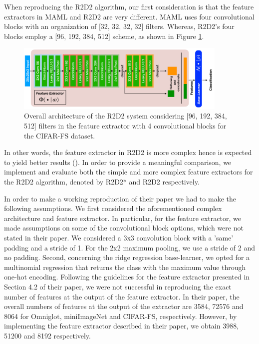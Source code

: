 When reproducing the R2D2 algorithm, our first consideration is that the feature extractors in MAML and R2D2 are very different. MAML uses four convolutional blocks with an organization of [32, 32, 32, 32] filters. Whereas, R2D2's four blocks employ a [96, 192, 384, 512] scheme, as shown in Figure \ref{fig:arch}.
\begin{figure}
  \centering
  \includegraphics[width=0.9\textwidth]{Archi.pdf}
  \caption{Overall architecture of the R2D2 system considering [96, 192, 384, 512] filters in the feature extractor with 4 convolutional blocks for the \textsc{CIFAR-FS} dataset.}
  \label{fig:arch}
\end{figure}
In other words, the feature extractor in R2D2 is more complex hence is expected to yield better results (\citet{mhaskar2016learning}). In order to provide a meaningful comparison, we implement and evaluate both the simple and more complex feature extractors for the R2D2 algorithm, denoted by R2D2* and R2D2 respectively.

In order to make a working reproduction of their paper we had to make the following assumptions. We first considered the aforementioned complex architecture and feature extractor. In particular, for the feature extractor, we made assumptions on some of the convolutional block options, which were not stated in their paper. We considered a 3x3 convolution block with a 'same' padding and a stride of 1. For the 2x2 maximum pooling, we use a stride of 2 and no padding. Second, concerning the ridge regression base-learner, we opted for a multinomial regression that returns the class with the maximum value through one-hot encoding.
Following the guidelines for the feature extractor presented in Section 4.2 of their paper, we were not successful in reproducing the exact number of features at the output of the feature extractor. In their paper, the overall numbers of features at the output of the extractor are 3584, 72576 and 8064 for Omniglot, miniImageNet and \textsc{CIFAR-FS}, respectively. However, by implementing the feature extractor described in their paper, we obtain 3988, 51200 and 8192 respectively.


